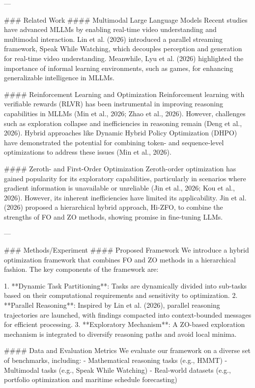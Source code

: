 ---

### Related Work
#### Multimodal Large Language Models
Recent studies have advanced MLLMs by enabling real-time video understanding and multimodal interaction. Lin et al. (2026) introduced a parallel streaming framework, Speak While Watching, which decouples perception and generation for real-time video understanding. Meanwhile, Lyu et al. (2026) highlighted the importance of informal learning environments, such as games, for enhancing generalizable intelligence in MLLMs.

#### Reinforcement Learning and Optimization
Reinforcement learning with verifiable rewards (RLVR) has been instrumental in improving reasoning capabilities in MLLMs (Min et al., 2026; Zhao et al., 2026). However, challenges such as exploration collapse and inefficiencies in reasoning remain (Deng et al., 2026). Hybrid approaches like Dynamic Hybrid Policy Optimization (DHPO) have demonstrated the potential for combining token- and sequence-level optimizations to address these issues (Min et al., 2026).

#### Zeroth- and First-Order Optimization
Zeroth-order optimization has gained popularity for its exploratory capabilities, particularly in scenarios where gradient information is unavailable or unreliable (Jin et al., 2026; Kou et al., 2026). However, its inherent inefficiencies have limited its applicability. Jin et al. (2026) proposed a hierarchical hybrid approach, Hi-ZFO, to combine the strengths of FO and ZO methods, showing promise in fine-tuning LLMs.

---

### Methods/Experiment
#### Proposed Framework
We introduce a hybrid optimization framework that combines FO and ZO methods in a hierarchical fashion. The key components of the framework are:

1. **Dynamic Task Partitioning**: Tasks are dynamically divided into sub-tasks based on their computational requirements and sensitivity to optimization.
2. **Parallel Reasoning**: Inspired by Lin et al. (2026), parallel reasoning trajectories are launched, with findings compacted into context-bounded messages for efficient processing.
3. **Exploratory Mechanism**: A ZO-based exploration mechanism is integrated to diversify reasoning paths and avoid local minima.

#### Data and Evaluation Metrics
We evaluate our framework on a diverse set of benchmarks, including:
- Mathematical reasoning tasks (e.g., HMMT)
- Multimodal tasks (e.g., Speak While Watching)
- Real-world datasets (e.g., portfolio optimization and maritime schedule forecasting)

